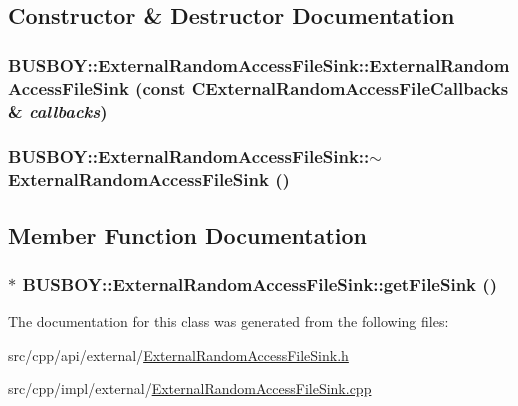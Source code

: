 \subsection{Constructor \& Destructor Documentation}
\hypertarget{classBUSBOY_1_1ExternalRandomAccessFileSink_ad7ff7c357b918df30c78c8f30ff2a3ea}{
\subsubsection[{ExternalRandomAccessFileSink}]{\setlength{\rightskip}{0pt plus 5cm}BUSBOY::ExternalRandomAccessFileSink::ExternalRandomAccessFileSink (const {\bf CExternalRandomAccessFileCallbacks} \& {\em callbacks})}}
\label{classBUSBOY_1_1ExternalRandomAccessFileSink_ad7ff7c357b918df30c78c8f30ff2a3ea}
\hypertarget{classBUSBOY_1_1ExternalRandomAccessFileSink_a5e7e28bc992756ffe22188324bb532d8}{
\subsubsection[{$\sim$ExternalRandomAccessFileSink}]{\setlength{\rightskip}{0pt plus 5cm}BUSBOY::ExternalRandomAccessFileSink::$\sim$ExternalRandomAccessFileSink ()}}
\label{classBUSBOY_1_1ExternalRandomAccessFileSink_a5e7e28bc992756ffe22188324bb532d8}


\subsection{Member Function Documentation}
\hypertarget{classBUSBOY_1_1ExternalRandomAccessFileSink_aca94bc2a3d7af5e34b170a6eefafd9df}{
\subsubsection[{getFileSink}]{ $\ast$ BUSBOY::ExternalRandomAccessFileSink::getFileSink ()}}
\label{classBUSBOY_1_1ExternalRandomAccessFileSink_aca94bc2a3d7af5e34b170a6eefafd9df}


The documentation for this class was generated from the following files:\begin{DoxyCompactItemize}
\item 
src/cpp/api/external/\hyperlink{ExternalRandomAccessFileSink_8h}{ExternalRandomAccessFileSink.h}\item 
src/cpp/impl/external/\hyperlink{ExternalRandomAccessFileSink_8cpp}{ExternalRandomAccessFileSink.cpp}\end{DoxyCompactItemize}
